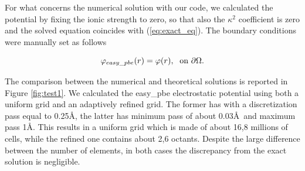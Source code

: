 \documentclass[11pt,a4paper]{article}
\begin{document}
For what concerns the numerical solution with our code, we calculated the potential by fixing the ionic strength to zero, so that also the $\kappa^2$ coefficient is zero and the solved equation coincides with (\ref{eq:exact_eq}). The boundary conditions were manually set as follows 

\begin{equation*}
    {\varphi}_{easy\_pbe}(r) = {\varphi}(r), \mbox{\; on } \partial \Omega.
\end{equation*}


The comparison between the numerical and theoretical solutions is reported in Figure \ref{fig:test1}. We calculated the easy\_pbe electrostatic potential using both a uniform grid and an adaptively refined grid. The former has with a discretization pass equal to 0.25\AA, the latter has minimum pass of about 0.03\AA\ and maximum pass 1\AA. This results in a uniform grid which is made of about 16,8 millions of cells, while the refined one contains about 2,6 octants.
Despite the large difference between the number of elements, in both cases the discrepancy from the exact solution is negligible.
\end{document}
